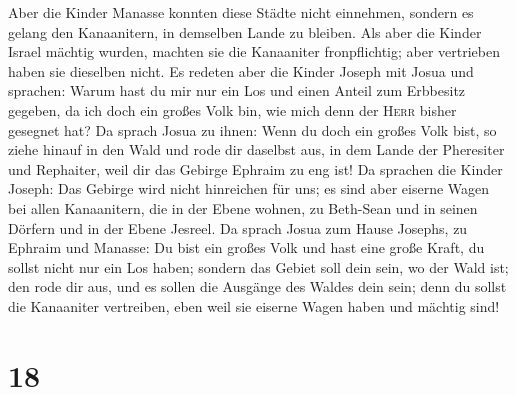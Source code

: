  Aber die Kinder Manasse konnten diese Städte nicht
einnehmen, sondern es gelang den Kanaanitern, in demselben Lande zu
bleiben.  Als aber die Kinder Israel mächtig wurden,
machten sie die Kanaaniter fronpflichtig; aber vertrieben haben sie
dieselben nicht.  Es redeten aber die Kinder Joseph mit
Josua und sprachen: Warum hast du mir nur ein Los und einen Anteil zum
Erbbesitz gegeben, da ich doch ein großes Volk bin, wie mich denn der
\textsc{Herr} bisher gesegnet hat?  Da sprach Josua zu
ihnen: Wenn du doch ein großes Volk bist, so ziehe hinauf in den Wald
und rode dir daselbst aus, in dem Lande der Pheresiter und Rephaiter,
weil dir das Gebirge Ephraim zu eng ist!  Da sprachen die
Kinder Joseph: Das Gebirge wird nicht hinreichen für uns; es sind aber
eiserne Wagen bei allen Kanaanitern, die in der Ebene wohnen, zu
Beth-Sean und in seinen Dörfern und in der Ebene Jesreel.
 Da sprach Josua zum Hause Josephs, zu Ephraim und
Manasse: Du bist ein großes Volk und hast eine große Kraft, du sollst
nicht nur ein Los haben;  sondern das Gebiet soll dein
sein, wo der Wald ist; den rode dir aus, und es sollen die Ausgänge des
Waldes dein sein; denn du sollst die Kanaaniter vertreiben, eben weil
sie eiserne Wagen haben und mächtig sind!

\hypertarget{section-17}{%
\section{18}\label{section-17}}

